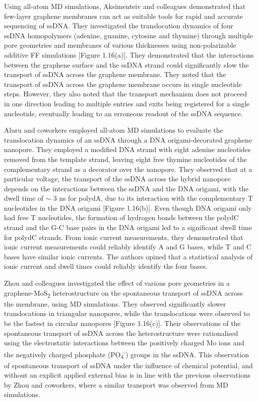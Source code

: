 Using all-atom MD simulations, Aksimenteiv and colleagues demonstrated that few-layer graphene membranes can act as suitable tools for rapid and accurate sequencing of ssDNA.\supercite{wells_assessing_2012} They investigated the translocation dynamics of four ssDNA homopolymers (adenine, guanine, cytosine and thymine) through multiple pore geometries and membranes of various thicknesses using non-polarizable additive FF simulations [Figure 1.16(a)]. They demonstrated that the interactions between the graphene surface and the ssDNA strand could significantly slow the transport of ssDNA across the graphene membrane. They noted that the transport of ssDNA across the graphene membrane occurs in single nucleotide steps. However, they also noted that the transport mechanism does not proceed in one direction leading to multiple entries and exits being registered for a single nucleotide, eventually leading to an erroneous readout of the ssDNA sequence.

Aluru and coworkers employed all-atom MD simulations to evaluate the translocation dynamics of an ssDNA through a DNA origami-decorated graphene nanopore.\supercite{barati_farimani_dna_2017} They employed a modified DNA strand with eight adenine nucleotides removed from the template strand, leaving eight free thymine nucleotides of the complementary strand as a decorator over the nanopore. They observed that at a particular voltage, the transport of the ssDNA across the hybrid nanopore depends on the interactions between the ssDNA and the DNA origami, with the dwell time of $\sim$ 3 ns for polydA, due to its interaction with the complementary T nucleotides in the DNA origami [Figure 1.16(b)]. Even though DNA origami only had free T nucleotides, the formation of hydrogen bonds between the polydC strand and the G-C base pairs in the DNA origami led to a significant dwell time for polydC strands. From ionic current measurements, they demonstrated that ionic current measurements could reliably identify A and G bases, while T and C bases have similar ionic currents. The authors opined that a statistical analysis of ionic current and dwell times could reliably identify the four bases.

Zhou and colleagues investigated the effect of various pore geometries in a graphene-MoS\textsubscript{2} heterostructure on the spontaneous transport of ssDNA across the membrane, using MD simulations\supercite{zou_spontaneous_2020}. They observed significantly slower translocations in triangular nanopores, while the translocations were observed to be the fastest in circular nanopores [Figure 1.16(c)]. Their observations of the spontaneous transport of ssDNA across the heterostructure were rationalised using the electrostatic interactions between the positively charged Mo ions and the negatively charged phosphate (PO\textsubscript{4}\textsuperscript{-}) groups in the ssDNA. This observation of spontaneous transport of ssDNA under the influence of chemical potential, and without an explicit applied external bias is in line with the previous observations by Zhou and coworkers, where a similar transport was observed from MD simulations\supercite{luan_spontaneous_2018}.

